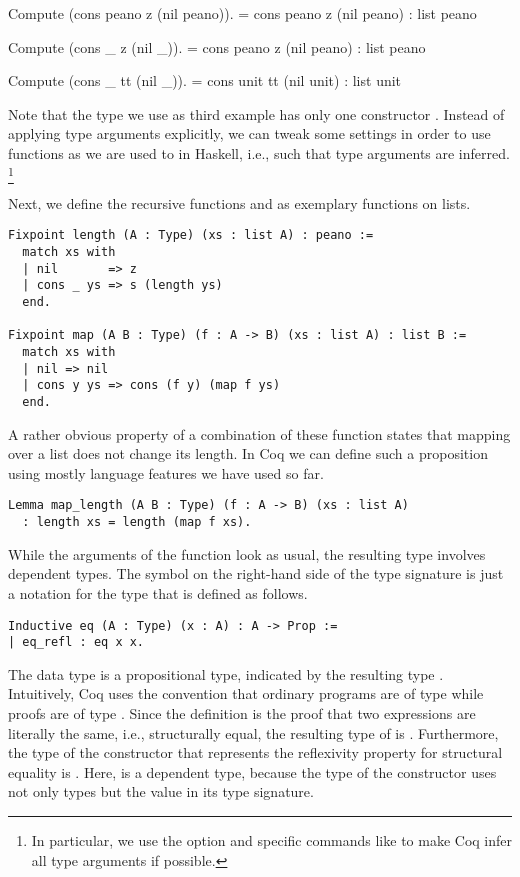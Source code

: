 \begin{crepl}
\coqrepl Compute (cons peano z (nil peano)).
    = cons peano z (nil peano)
    : list peano

\coqrepl Compute (cons _ z (nil _)).
    = cons peano z (nil peano)
    : list peano

\coqrepl Compute (cons _ tt (nil _)).
    = cons unit tt (nil unit)
    : list unit
\end{crepl}

Note that the type  we use as third example has only one constructor .
Instead of applying type arguments explicitly, we can tweak some settings in order to use functions as we are used to in Haskell, i.e., such that type arguments are inferred. \footnote{In particular, we use the option  and specific commands like  to make Coq infer all type arguments if possible.}

Next, we define the recursive functions  and  as exemplary functions on lists.

\begin{verbatim}
Fixpoint length (A : Type) (xs : list A) : peano :=
  match xs with
  | nil       => z
  | cons _ ys => s (length ys)
  end.

Fixpoint map (A B : Type) (f : A -> B) (xs : list A) : list B :=
  match xs with
  | nil => nil
  | cons y ys => cons (f y) (map f ys)
  end.
\end{verbatim}

A rather obvious property of a combination of these function states that mapping over a list does not change its length.
In Coq we can define such a proposition using mostly language features we have used so far.

\begin{verbatim}
Lemma map_length (A B : Type) (f : A -> B) (xs : list A)
  : length xs = length (map f xs).
\end{verbatim}

While the arguments of the function  look as usual, the resulting type involves dependent types.
The symbol \cinl{=} on the right-hand side of the type signature is just a notation for the type  that is defined as follows.

\begin{verbatim}
Inductive eq (A : Type) (x : A) : A -> Prop :=
| eq_refl : eq x x.
\end{verbatim}

The data type  is a propositional type, indicated by the resulting type .
Intuitively, Coq uses the convention that ordinary programs are of type  while proofs are of type .
Since the definition  is the proof that two expressions are literally the same, i.e., structurally equal, the resulting type of  is .
Furthermore, the type of the constructor  that represents the reflexivity property for structural equality is .
Here,  is a dependent type, because the type of the constructor  uses not only types but the value  in its type signature.

